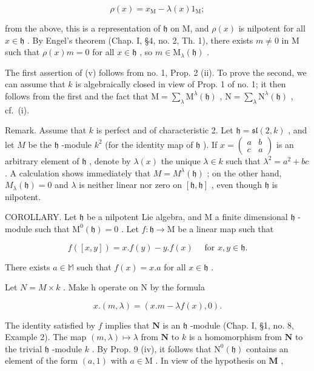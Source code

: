 \[
\rho (x) = x _ {\mathrm{M}} - \lambda (x) 1 _ {\mathrm{M}};
\]

from the above, this is a representation of \(\mathfrak{h}\) on M, and \(\rho(x)\) is nilpotent for all \(x \in \mathfrak{h}\) . By Engel's theorem (Chap. I, §4, no. 2, Th. 1), there exists \(m \neq 0\) in M such that \(\rho(x)m = 0\) for all \(x \in \mathfrak{h}\) , so \(m \in \mathrm{M}_{\lambda}(\mathfrak{h})\) .

The first assertion of (v) follows from no. 1, Prop. 2 (ii). To prove the second, we can assume that \(k\) is algebraically closed in view of Prop. 1 of no. 1; it then follows from the first and the fact that \(\mathrm{M} = \sum_{\lambda} \mathrm{M}^{\lambda}(\mathfrak{h})\) , \(\mathrm{N} = \sum_{\lambda} \mathrm{N}^{\lambda}(\mathfrak{h})\) , cf.~(i).

Remark. Assume that \(k\) is perfect and of characteristic 2. Let \(\mathfrak{h} = \mathfrak{sl}(2, k)\) , and let \(M\) be the \(\mathfrak{h}\) -module \(k^2\) (for the identity map of \(\mathfrak{h}\) ). If \(x = \begin{pmatrix} a & b \\ c & a \end{pmatrix}\) is an arbitrary element of \(\mathfrak{h}\) , denote by \(\lambda(x)\) the unique \(\lambda \in k\) such that \(\lambda^2 = a^2 + bc\) . A calculation shows immediately that \(M = M^\lambda(\mathfrak{h})\) ; on the other hand, \(M_\lambda(\mathfrak{h}) = 0\) and \(\lambda\) is neither linear nor zero on \([\mathfrak{h}, \mathfrak{h}]\) , even though \(\mathfrak{h}\) is nilpotent.

COROLLARY. Let \(\mathfrak{h}\) be a nilpotent Lie algebra, and M a finite dimensional \(\mathfrak{h}\) -module such that \(\mathrm{M}^0 (\mathfrak{h}) = 0\) . Let \(f:\mathfrak{h}\to \mathrm{M}\) be a linear map such that

\[
f ([ x, y ]) = x. f (y) - y. f (x) \quad \text { for } x, y \in \mathfrak {h}.
\]

There exists \(a \in \mathbb{M}\) such that \(f(x) = x.a\) for all \(x \in \mathfrak{h}\) .

Let \(N = M \times k\) . Make h operate on N by the formula

\[
x. (m, \lambda) = (x. m - \lambda f (x), 0).
\]

The identity satisfied by \(f\) implies that \(\mathbf{N}\) is an \(\mathfrak{h}\) -module (Chap. I, §1, no. 8, Example 2). The map \((m, \lambda) \mapsto \lambda\) from \(\mathbf{N}\) to \(k\) is a homomorphism from \(\mathbf{N}\) to the trivial \(\mathfrak{h}\) -module \(k\) . By Prop. 9 (iv), it follows that \(\mathrm{N}^0(\mathfrak{h})\) contains an element of the form \((a, 1)\) with \(a \in \mathrm{M}\) . In view of the hypothesis on \(\mathbf{M}\) ,

